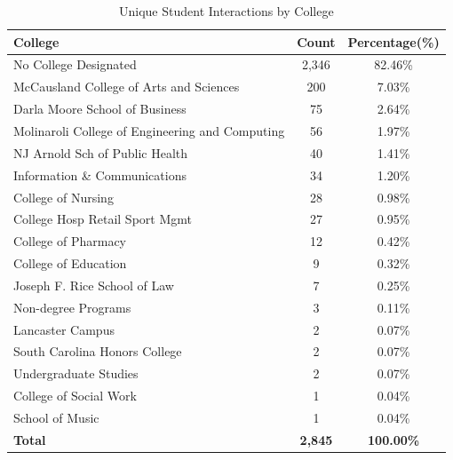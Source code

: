 \documentclass[
  letterpaper,
  DIV=11,
  numbers=noendperiod]{scrartcl}
\begin{document}
\begin{longtable}[t]{lcc}
\caption{\label{tab:CollegeTabSG}Unique Student Interactions by College}\\
\toprule
\textbf{College} & \textbf{Count} & \textbf{Percentage(\%)}\\
\midrule
No College Designated & 2,346 & 82.46\%\\
McCausland College of Arts and Sciences & 200 & 7.03\%\\
Darla Moore School of Business & 75 & 2.64\%\\
Molinaroli College of Engineering and Computing & 56 & 1.97\%\\
NJ Arnold Sch of Public Health & 40 & 1.41\%\\
\addlinespace
Information \& Communications & 34 & 1.20\%\\
College of Nursing & 28 & 0.98\%\\
College Hosp Retail Sport Mgmt & 27 & 0.95\%\\
College of Pharmacy & 12 & 0.42\%\\
College of Education & 9 & 0.32\%\\
\addlinespace
Joseph F. Rice School of Law & 7 & 0.25\%\\
Non-degree Programs & 3 & 0.11\%\\
Lancaster Campus & 2 & 0.07\%\\
South Carolina Honors College & 2 & 0.07\%\\
Undergraduate Studies & 2 & 0.07\%\\
\addlinespace
College of Social Work & 1 & 0.04\%\\
School of Music & 1 & 0.04\%\\
\midrule
\textbf{Total} & \textbf{2,845} & \textbf{100.00\%}\\
\bottomrule
\end{longtable}
\endgroup{}

\clearpage
\FloatBarrier

\begin{table}[!h]
\centering
\caption{\label{tab:OvrllClssStndSG}Unique Student Interactions by Class Standing}
\centering
{}
\end{table}
\end{document}
